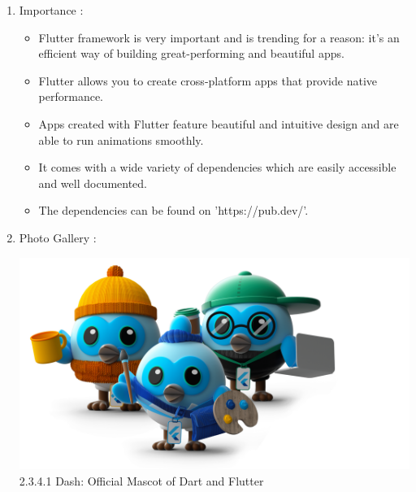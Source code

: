 \documentclass[11pt,a4paper,oneside,openright]{report}
\begin{document}
{{\begin{enumerate}
\item Importance :
\begin{itemize}
\item Flutter framework is very important and is trending for a reason: it's an efficient way of building great-performing and beautiful apps.
\item Flutter allows you to create cross-platform apps that provide native performance. 
\item Apps created with Flutter feature beautiful and intuitive design and are able to run animations smoothly. 
\item   It comes with a wide variety of dependencies which are easily accessible and well documented. 
\item The dependencies can be found on 'https://pub.dev/'.
\end{itemize} 

\newpage

\item Photo Gallery :\\
\hspace{0.2in}
\begin{center}
\includegraphics[scale=0.15]{dash.png}\\
2.3.4.1 Dash: Official Mascot of Dart and Flutter
\end{center}

\hspace{0.2in}


\end{enumerate}}}
\end{document}
